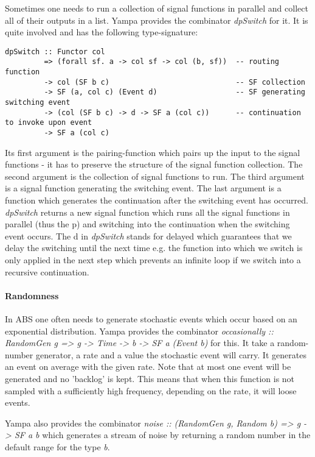 Sometimes one needs to run a collection of signal functions in parallel and collect all of their outputs in a list. Yampa provides the combinator \textit{dpSwitch} for it. It is quite involved and has the following type-signature:

\begin{verbatim}
dpSwitch :: Functor col
         => (forall sf. a -> col sf -> col (b, sf))  -- routing function
         -> col (SF b c)                             -- SF collection
         -> SF (a, col c) (Event d)                  -- SF generating switching event
         -> (col (SF b c) -> d -> SF a (col c))      -- continuation to invoke upon event
         -> SF a (col c)
\end{verbatim}

Its first argument is the pairing-function which pairs up the input to the signal functions - it has to preserve the structure of the signal function collection. The second argument is the collection of signal functions to run. The third argument is a signal function generating the switching event. The last argument is a function which generates the continuation after the switching event has occurred. \textit{dpSwitch} returns a new signal function which runs all the signal functions in parallel (thus the p) and switching into the continuation when the switching event occurs. The d in \textit{dpSwitch} stands for delayed which guarantees that we delay the switching until the next time e.g. the function into which we switch is only applied in the next step which prevents an infinite loop if we switch into a recursive continuation.

\paragraph{Randomness}
In ABS one often needs to generate stochastic events which occur based on an exponential distribution. Yampa provides the combinator \textit{occasionally :: RandomGen g => g -> Time -> b -> SF a (Event b)} for this. It take a random-number generator, a rate and a value the stochastic event will carry. It generates an event on average with the given rate. Note that at most one event will be generated and no 'backlog' is kept. This means that when this function is not sampled with a sufficiently high frequency, depending on the rate, it will loose events.

Yampa also provides the combinator \textit{noise :: (RandomGen g, Random b) => g -> SF a b} which generates a stream of noise by returning a random number in the default range for the type \textit{b}.

